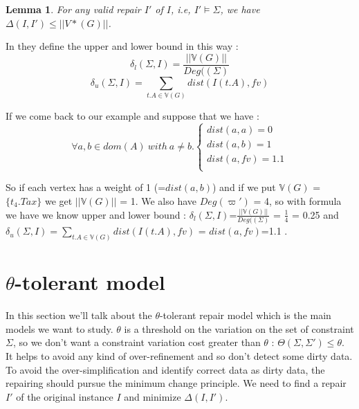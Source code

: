 \documentclass[letterpaper, 12pt]{report}
\newtheorem{mylemma}{Lemma}
\begin{document}
\begin{mylemma}
	For any valid repair $I'$ of $I$, i.e, $I' \models \Sigma$, we have $\Delta(I,I') \leq ||V*(G)||$. 
\end{mylemma}


In \cite{main} they define the upper and lower bound in this way :
$$ \delta_l(\Sigma,I) = \frac{||\mathbb{V}(G)||}{Deg((\Sigma)}$$
$$ \delta_u(\Sigma,I) = \sum_{t.A \in \mathbb{V}(G)} dist(I(t.A),fv)$$

If we come back to our example and suppose that we have :
$$
\forall a,b \in dom(A) \ with \ a \neq b.
\left\{
	\begin{array}{ll}
	   dist(a,a)=0\\
	   dist(a,b)=1\\
	   dist(a,fv)=1.1\\
	\end{array}
\right.
$$

So if each vertex has a weight of 1 (=$ dist(a,b)$) and if we put $\mathbb{V}(G)$ = $\{t_4.Tax \}$ we get $||\mathbb{V}(G)||$ = 1. We also have $Deg(\varpi')$ = 4, so with formula we have we know upper and lower bound : $\delta_l(\Sigma,I)$=$\frac{||\mathbb{V}(G)||}{Deg((\Sigma)}$ = $\frac{1}{4}$ = 0.25 and $\delta_u(\Sigma,I) = \sum_{t.A \in \mathbb{V}(G)} dist(I(t.A),fv)$ = $dist(a,fv)$=1.1 .


\section{$\theta$-tolerant model}

In this section we'll talk about the $\theta$-tolerant repair model which is the main models we want to study. $\theta$ is a threshold on the variation on the set of constraint $\Sigma$, so we don't want a constraint variation cost greater than $\theta$ : $\Theta(\Sigma,\Sigma') \leq \theta$. It helps to avoid any kind of over-refinement and so don't detect some dirty data. To avoid the over-simplification and identify correct data as dirty data, the repairing should pursue the minimum change principle. We need to find a repair $I'$ of the original instance $I$ and minimize $\Delta(I,I')$.\\
\end{document}
